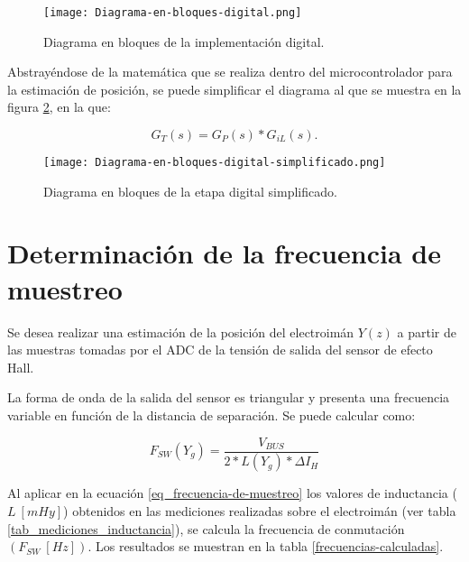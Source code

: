 \begin{figure}[H]
	\centering
	\texttt{[image: Diagrama-en-bloques-digital.png]}
	\caption{Diagrama en bloques de la implementación digital.}
	\label{fig:diag-en-bloques-digital}
\end{figure}

\noindent Abstrayéndose de la matemática que se realiza dentro del microcontrolador para la estimación de posición, se puede simplificar el diagrama al que se muestra en la figura \ref{fig:diag-en-bloques-digital-simplif}, en la que:

\begin{equation} 
	G_T(s) = G_P(s) * G_{iL}(s).
\end{equation}

\begin{figure}[H]
	\centering
	\texttt{[image: Diagrama-en-bloques-digital-simplificado.png]}
	\caption{Diagrama en bloques de la etapa digital simplificado.}
	\label{fig:diag-en-bloques-digital-simplif}
\end{figure}


\section{Determinación de la frecuencia de muestreo}

\noindent Se desea realizar una estimación de la posición del electroimán $Y(z)$  a partir de las muestras tomadas por el ADC de la tensión de salida del sensor de efecto Hall.

\noindent La forma de onda de la salida del sensor es triangular y presenta una frecuencia variable en función de la distancia de separación. Se puede calcular como:

\begin{equation} \label{eq_frecuencia-de-muestreo}
	F_{SW}(Y_g)=\frac{V_{BUS}}{2 * L(Y_g) * \Delta I_H}
\end{equation}



 Al aplicar en la ecuación \ref{eq_frecuencia-de-muestreo} los valores de inductancia ($L\:[mHy]$) obtenidos en las mediciones realizadas sobre el electroimán (ver tabla \ref{tab_mediciones_inductancia}), se calcula la frecuencia de conmutación  $(F_{SW}\:[Hz])$. Los resultados se muestran en la tabla \ref{frecuencias-calculadas}.



